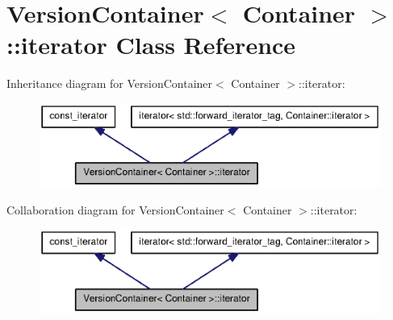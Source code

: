 \section{\-Version\-Container$<$ \-Container $>$\-:\-:iterator \-Class \-Reference}
\label{classAPT_1_1VersionContainer_1_1iterator}


\-Inheritance diagram for \-Version\-Container$<$ \-Container $>$\-:\-:iterator\-:
\nopagebreak
\begin{figure}[H]
\begin{center}
\leavevmode
\includegraphics[width=350pt]{classAPT_1_1VersionContainer_1_1iterator__inherit__graph}
\end{center}
\end{figure}


\-Collaboration diagram for \-Version\-Container$<$ \-Container $>$\-:\-:iterator\-:
\nopagebreak
\begin{figure}[H]
\begin{center}
\leavevmode
\includegraphics[width=350pt]{classAPT_1_1VersionContainer_1_1iterator__coll__graph}
\end{center}
\end{figure}
